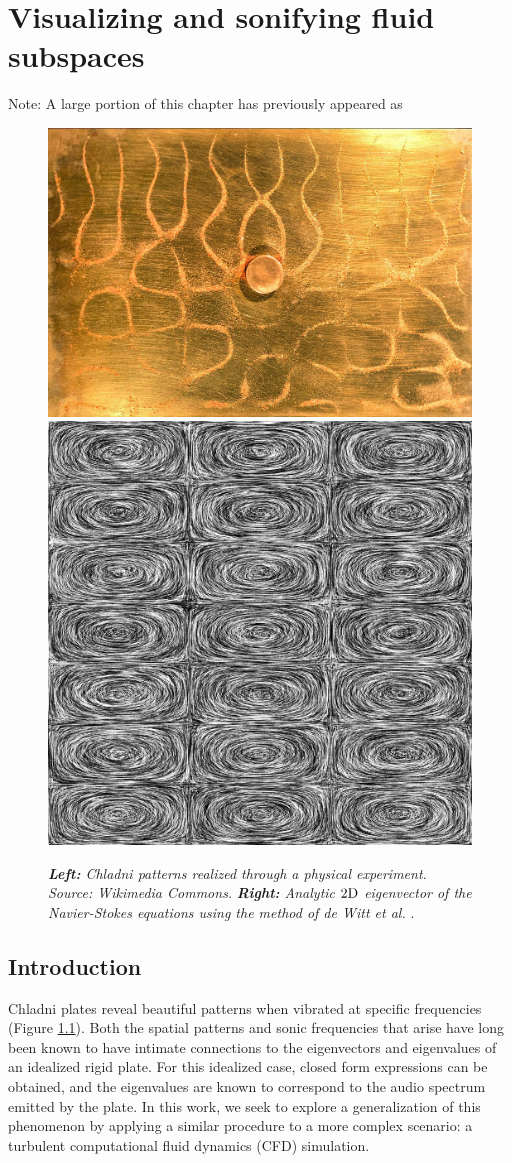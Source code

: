 \chapter[Visualizing and sonifying fluid subspaces]{Visualizing and sonifying fluid subspaces}

Note: A large portion of this chapter has previously appeared as 
\bigskip\bigskip

\begin{figure}[H]
		\centering
		\includegraphics[height=0.3\textwidth]{chap5/figures/chladni_plate.jpg}
		\includegraphics[height=0.3\textwidth]{chap5/figures/LIC.jpg}
		\caption{{\em{\bf Left:} Chladni patterns realized through a physical experiment. Source: Wikimedia Commons.} {\em{\bf Right:} Analytic $2\textnormal{D}$ eigenvector of the Navier-Stokes equations using the method of de Witt et al.} \cite{deWitt:2012}.}
		\label{fig:chladni-plate}
\end{figure}

\section*{Introduction}
Chladni plates reveal beautiful patterns when vibrated at specific frequencies (Figure \ref{fig:chladni-plate}). Both the spatial patterns and sonic frequencies that arise have long been known to have intimate connections to the eigenvectors and eigenvalues of an idealized rigid plate. For this idealized case, closed form expressions can be obtained, and the eigenvalues are known to correspond to the audio spectrum emitted by the plate. In this work, we seek to explore a generalization of this phenomenon by applying a similar procedure to a more complex scenario: a turbulent computational fluid dynamics (CFD) simulation.

